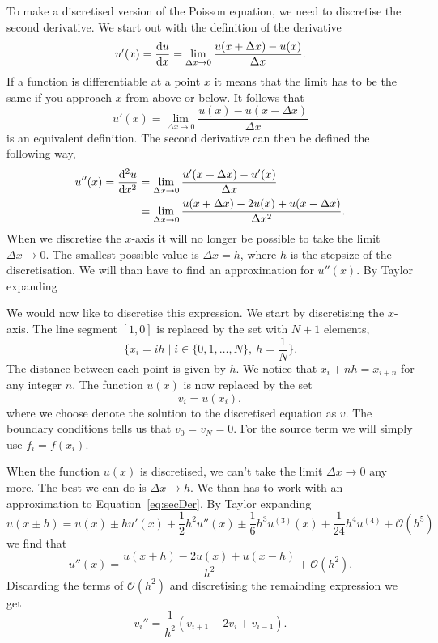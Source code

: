 \documentclass[english,notitlepage,aps,pra,10pt]{revtex4-1}  %
\begin{document}
To make a discretised version of the Poisson equation, we need to discretise the second derivative. We start out with the definition of the derivative
\begin{equation}
    u'(x) = \dv{u}{x} = \lim_{\Delta x \to 0} \frac{u(x+\Delta x) - u(x)}{\Delta x}.
\end{equation}
If a function is differentiable at a point $x$ it means that the limit has to be the same if you approach $x$ from above or below. It follows that 
\begin{equation}
    u'(x) = \lim_{\Delta x \to 0} \frac{u(x) - u(x-\Delta x)}{\Delta x}
\end{equation}
is an equivalent definition. The second derivative can then be defined the following way,
\begin{equation}
    \begin{split}
        u''(x) = \dv[2]{u}{x} &= \lim_{\Delta x \to 0} \frac{u'(x+\Delta x) - u'(x)}{\Delta x} \\
            &= \lim_{\Delta x \to 0} \frac{u(x+\Delta x) - 2u(x) + u(x-\Delta x)}{\Delta x^2}.
    \end{split}
    \label{eq:secDer}
\end{equation}
When we discretise the $x$-axis it will no longer be possible to take the limit $\Delta x \to 0$. The smallest possible value is $\Delta x = h$, where $h$ is the stepsize of the discretisation. We will than have to find an approximation for $u''(x)$. By Taylor expanding 

We would now like to discretise this expression. We start by discretising the $x$-axis. The line segment $[1,0]$ is replaced by the set with $N+1$ elements, 
\begin{equation}
    \{x_i = i h \mid i\in\{0,1, \dots, N\},\ h = \frac{1}{N}\}.
\end{equation}
The distance between each point is given by $h$. We notice that $x_i + nh = x_{i+n}$ for any integer $n$. The function $u(x)$ is now replaced by the set
\begin{equation}
    v_i = u(x_i),
\end{equation}
where we choose denote the solution to the discretised equation as $v$. The boundary conditions tells us that $v_0 = v_N = 0$. For the source term we will simply use $f_i = f(x_i)$. 

When the function $u(x)$ is discretised, we can't take the limit $\Delta x \to 0$ any more. The best we can do is $\Delta x \to h$. We than has to work with an approximation to Equation~\ref{eq:secDer}. By Taylor expanding 
\begin{equation}
    u(x \pm h) = u(x) \pm h u'(x) + \frac{1}{2} h^2 u''(x) \pm \frac{1}{6} h^3 u^{(3)}(x) + \frac{1}{24} h^4 u^{(4)} + \mathcal{O}(h^5)
\end{equation}
we find that 
\begin{equation}
    u''(x) = \frac{u(x+h) - 2u(x) + u(x-h)}{h^2} + \mathcal{O}(h^2).
\end{equation}
Discarding the terms of $\mathcal{O}(h^2)$ and discretising the remainding expression we get
\begin{equation}
    v_i'' = \frac{1}{h^2}(v_{i+1} - 2v_i + v_{i-1}).
\end{equation}
\end{document}
